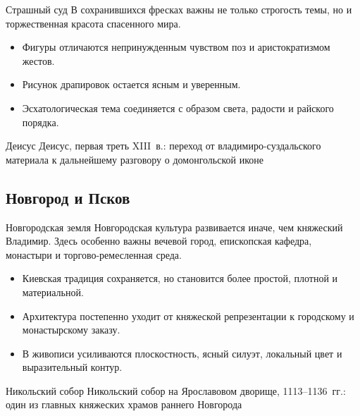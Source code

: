 \begin{frame}{Страшный суд}
  В сохранившихся фресках важны не только строгость темы,
  но и торжественная красота спасенного мира.

  \begin{itemize}
    \item Фигуры отличаются непринужденным чувством поз
          и аристократизмом жестов.
    \item Рисунок драпировок остается ясным и уверенным.
    \item Эсхатологическая тема соединяется с образом света,
          радости и райского порядка.
  \end{itemize}
\end{frame}

\begin{frame}{Деисус}
    {Деисус, первая треть XIII~в.:
     переход от владимиро-суздальского материала
     к дальнейшему разговору о домонгольской иконе}
\end{frame}

\subsection{Новгород и Псков}

\begin{frame}{Новгородская земля}
  Новгородская культура развивается иначе, чем княжеский Владимир.
  Здесь особенно важны вечевой город, епископская кафедра,
  монастыри и торгово-ремесленная среда.

  \begin{itemize}
    \item Киевская традиция сохраняется, но становится более простой,
          плотной и материальной.
    \item Архитектура постепенно уходит от княжеской репрезентации
          к городскому и монастырскому заказу.
    \item В живописи усиливаются плоскостность, ясный силуэт,
          локальный цвет и выразительный контур.
  \end{itemize}
\end{frame}

\begin{frame}{Никольский собор}
    {Никольский собор на Ярославовом дворище, 1113--1136~гг.:
     один из главных княжеских храмов раннего Новгорода}
\end{frame}

